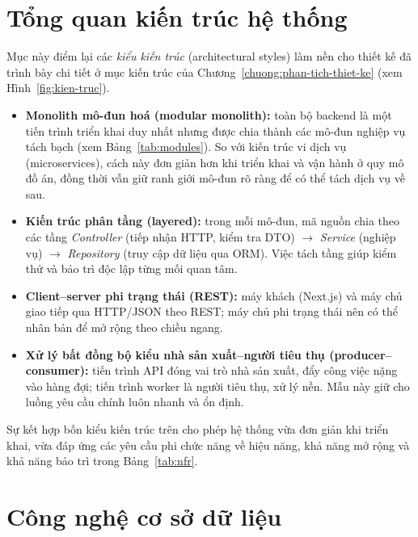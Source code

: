 \section{Tổng quan kiến trúc hệ thống}
\label{sec:kien-truc-tong-quan}

Mục này điểm lại các \textit{kiểu kiến trúc} (architectural styles) làm nền
cho thiết kế đã trình bày chi tiết ở mục kiến trúc của
Chương~\ref{chuong:phan-tich-thiet-ke} (xem Hình~\ref{fig:kien-truc}).

\begin{itemize}
  \item \textbf{Monolith mô-đun hoá (modular monolith):} toàn bộ backend là
        một tiến trình triển khai duy nhất nhưng được chia thành các mô-đun
        nghiệp vụ tách bạch (xem Bảng~\ref{tab:modules}). So với kiến trúc
        vi dịch vụ (microservices), cách này đơn giản hơn khi triển khai và
        vận hành ở quy mô đồ án, đồng thời vẫn giữ ranh giới mô-đun rõ ràng
        để có thể tách dịch vụ về sau.
  \item \textbf{Kiến trúc phân tầng (layered):} trong mỗi mô-đun, mã nguồn
        chia theo các tầng \textit{Controller} (tiếp nhận HTTP, kiểm tra
        DTO) \( \to \) \textit{Service} (nghiệp vụ) \( \to \)
        \textit{Repository} (truy cập dữ liệu qua ORM). Việc tách tầng giúp
        kiểm thử và bảo trì độc lập từng mối quan tâm.
  \item \textbf{Client--server phi trạng thái (REST):} máy khách
        (Next.js) và máy chủ giao tiếp qua HTTP/JSON theo REST; máy chủ phi
        trạng thái nên có thể nhân bản để mở rộng theo chiều ngang.
  \item \textbf{Xử lý bất đồng bộ kiểu nhà sản xuất--người tiêu thụ
        (producer--consumer):} tiến trình API đóng vai trò nhà sản xuất, đẩy
        công việc nặng vào hàng đợi; tiến trình worker là người tiêu thụ,
        xử lý nền. Mẫu này giữ cho luồng yêu cầu chính luôn nhanh và ổn định.
\end{itemize}

Sự kết hợp bốn kiểu kiến trúc trên cho phép hệ thống vừa đơn giản khi triển
khai, vừa đáp ứng các yêu cầu phi chức năng về hiệu năng, khả năng mở rộng
và khả năng bảo trì trong Bảng~\ref{tab:nfr}.

\section{Công nghệ cơ sở dữ liệu}
\label{sec:cong-nghe-csdl}

